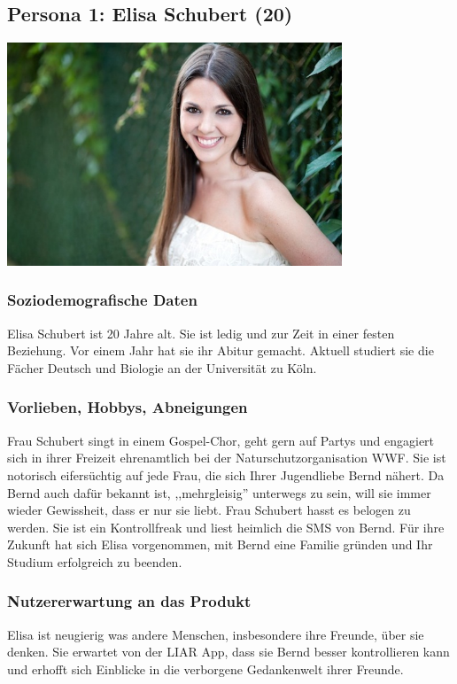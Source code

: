 \documentclass[10pt, a4paper, oneside, titlepage]{scrartcl} %
\begin{document}
	\subsection{Persona 1: Elisa Schubert (20)}
	\begin{center}
		\includegraphics[width=10.0cm]{persona_01.jpg}
	\end{center}
	\subsubsection{Soziodemografische Daten}
	Elisa Schubert ist 20 Jahre alt. Sie ist ledig und zur Zeit in einer festen Beziehung. Vor einem Jahr hat sie ihr Abitur gemacht. Aktuell studiert sie die Fächer Deutsch und Biologie an der Universität zu Köln.
	\subsubsection{Vorlieben, Hobbys, Abneigungen}
	Frau Schubert singt in einem Gospel-Chor, geht gern auf Partys und engagiert sich in ihrer Freizeit ehrenamtlich bei der Naturschutzorganisation WWF. Sie ist notorisch eifersüchtig auf jede Frau, die sich Ihrer Jugendliebe Bernd nähert. Da Bernd auch dafür bekannt ist, ,,mehrgleisig'' unterwegs zu sein, will sie immer wieder Gewissheit, dass er nur sie liebt. Frau Schubert hasst es belogen zu werden. Sie ist ein Kontrollfreak und liest heimlich die SMS von Bernd. Für ihre Zukunft hat sich Elisa vorgenommen, mit Bernd eine Familie gründen und Ihr Studium erfolgreich zu beenden. 
	\subsubsection{Nutzererwartung an das Produkt}
	Elisa ist neugierig was andere Menschen, insbesondere ihre Freunde, über sie denken. Sie erwartet von der LIAR App, dass sie Bernd besser kontrollieren kann und erhofft sich Einblicke in die verborgene Gedankenwelt ihrer Freunde.
\end{document}
